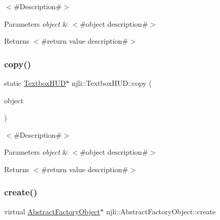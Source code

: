 $<$\#\+Description\#$>$


\begin{DoxyParams}{Parameters}
{\em object} & $<$\#object description\#$>$\\
\hline
\end{DoxyParams}
\begin{DoxyReturn}{Returns}
$<$\#return value description\#$>$ 
\end{DoxyReturn}
\mbox{\label{classnjli_1_1_textbox_h_u_d_a761b8b5f3efea690284284784fea9581}} 
\subsubsection{\texorpdfstring{copy()}{copy()}}
{\footnotesize\ttfamily static \mbox{\hyperlink{classnjli_1_1_textbox_h_u_d}{Textbox\+H\+UD}}$\ast$ njli\+::\+Textbox\+H\+U\+D\+::copy (\begin{DoxyParamCaption}\item[{const \mbox{\hyperlink{classnjli_1_1_textbox_h_u_d}{Textbox\+H\+UD}} \&}]{object }\end{DoxyParamCaption})\hspace{0.3cm}{\ttfamily [static]}}

$<$\#\+Description\#$>$


\begin{DoxyParams}{Parameters}
{\em object} & $<$\#object description\#$>$\\
\hline
\end{DoxyParams}
\begin{DoxyReturn}{Returns}
$<$\#return value description\#$>$ 
\end{DoxyReturn}
\mbox{\label{classnjli_1_1_textbox_h_u_d_a83a8876ae63b92804004cf3febe76573}} 
\subsubsection{\texorpdfstring{create()}{create()}\hspace{0.1cm}{\footnotesize\ttfamily [1/3]}}
{\footnotesize\ttfamily virtual \mbox{\hyperlink{classnjli_1_1_abstract_factory_object}{Abstract\+Factory\+Object}}$\ast$ njli\+::\+Abstract\+Factory\+Object\+::create}

